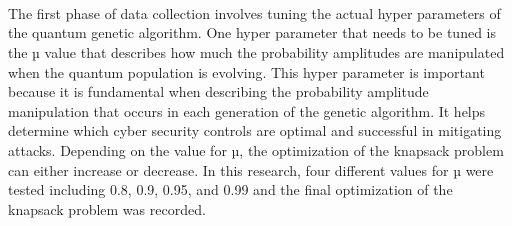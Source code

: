 \section*{\color{SectionBlue}{Results}} \label{sec:sections}
\subsection*{\color{SubSectionBlue}{Tuning Hyperparameters}}
 \\

The first phase of data collection involves tuning the actual hyper parameters of the quantum genetic algorithm. One hyper parameter that needs to be tuned is the µ value that describes how much the probability amplitudes are manipulated when the quantum population is evolving. This hyper parameter is important because it is fundamental when describing the probability amplitude manipulation that occurs in each generation of the genetic algorithm. It helps determine which cyber security controls are optimal and successful in mitigating attacks.  Depending on the value for µ, the optimization of the knapsack problem can either increase or decrease. In this research, four different values for µ were tested including 0.8, 0.9, 0.95, and 0.99 and the final optimization of the knapsack problem was recorded. \\ \newpage

